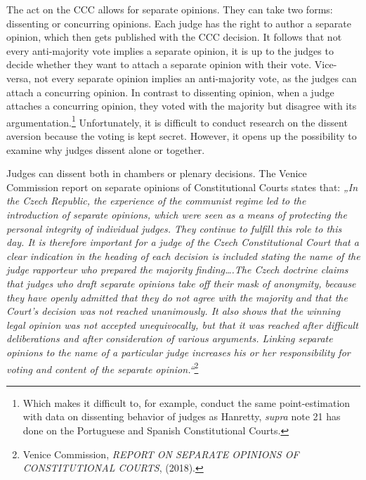 \documentclass[
  11pt,
]{article}
\begin{document}
The act on the CCC allows for separate opinions. They can take two forms: dissenting or concurring opinions. Each judge has the right to author a separate opinion, which then gets published with the CCC decision. It follows that not every anti-majority vote implies a separate opinion, it is up to the judges to decide whether they want to attach a separate opinion with their vote. Vice-versa, not every separate opinion implies an anti-majority vote, as the judges can attach a concurring opinion. In contrast to dissenting opinion, when a judge attaches a concurring opinion, they voted with the majority but disagree with its argumentation.\footnote{Which makes it difficult to, for example, conduct the same point-estimation with data on dissenting behavior of judges as Hanretty, \emph{supra} note 21 has done on the Portuguese and Spanish Constitutional Courts.} Unfortunately, it is difficult to conduct research on the dissent aversion because the voting is kept secret. However, it opens up the possibility to examine why judges dissent alone or together.

Judges can dissent both in chambers or plenary decisions. The Venice Commission report on separate opinions of Constitutional Courts states that: \emph{„In the Czech Republic, the experience of the communist regime led to the introduction of separate opinions, which were seen as a means of protecting the personal integrity of individual judges. They continue to fulfill this role to this day. It is therefore important for a judge of the Czech Constitutional Court that a clear indication in the heading of each decision is included stating the name of the judge rapporteur who prepared the majority finding\ldots.The Czech doctrine claims that judges who draft separate opinions take off their mask of anonymity, because they have openly admitted that they do not agree with the majority and that the Court's decision was not reached unanimously. It also shows that the winning legal opinion was not accepted unequivocally, but that it was reached after difficult deliberations and after consideration of various arguments. Linking separate opinions to the name of a particular judge increases his or her responsibility for voting and content of the separate opinion.``}\footnote{Venice Commission, \emph{{REPORT ON SEPARATE OPINIONS OF CONSTITUTIONAL COURTS}}, (2018).}
\end{document}
